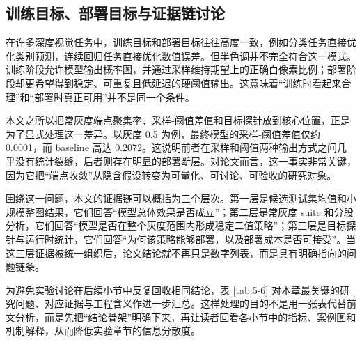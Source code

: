\documentclass[thesis]{../zstucs-graduation-project}
\begin{document}
\subsection{训练目标、部署目标与证据链讨论}
在许多深度视觉任务中，训练目标和部署目标往往高度一致，例如分类任务直接优化类别预测，连续回归任务直接优化数值误差。但半色调并不完全符合这一模式。训练阶段允许模型输出概率图，并通过采样维持期望上的正确白像素比例；部署阶段却更希望得到稳定、可重复且低延迟的硬阈值输出。这意味着“训练时看起来合理”和“部署时真正可用”并不是同一个条件。

本文之所以把常灰度端点聚集率、采样-阈值差值和目标探针放到核心位置，正是为了显式处理这一差异。以灰度 0.5 为例，最终模型的采样-阈值差值仅约 0.0001，而 baseline 高达 0.2072。这说明前者在采样和阈值两种输出方式之间几乎没有统计裂缝，后者则存在明显的部署断层。对论文而言，这一事实非常关键，因为它把“端点收敛”从隐含假设转变为可量化、可讨论、可验收的研究对象。

围绕这一问题，本文的证据链可以概括为三个层次。第一层是候选测试集均值和小规模整图结果，它们回答“模型总体效果是否成立”；第二层是常灰度 suite 和分段分析，它们回答“模型是否在整个灰度范围内形成稳定二值策略”；第三层是目标探针与运行时统计，它们回答“为何该策略能够部署，以及部署成本是否可接受”。当这三层证据被统一组织后，论文结论就不再只是数字列表，而是具有明确指向的问题链条。

为避免实验讨论在后续小节中反复回收相同结论，表 \ref{tab:5-6} 对本章最关键的研究问题、对应证据与工程含义作进一步汇总。这样处理的目的不是用一张表代替前文分析，而是先把“结论骨架”明确下来，再让读者回看各小节中的指标、案例图和机制解释，从而降低实验章节的信息分散度。
\end{document}
